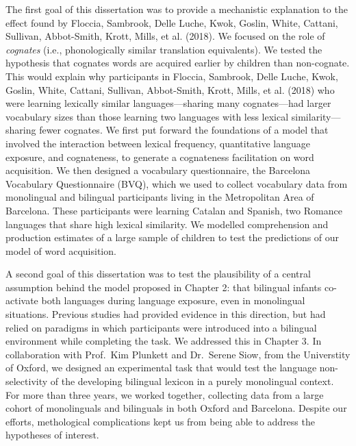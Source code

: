 \documentclass[
  12pt,
  b5paperpaper,
  twoside]{scrreprt}
\begin{document}
\begin{spacing}{1.5}
{The first goal of this dissertation was to provide a mechanistic
explanation to the effect found by Floccia, Sambrook, Delle Luche, Kwok,
Goslin, White, Cattani, Sullivan, Abbot-Smith, Krott, Mills, et al.
(2018). We focused on the role of \emph{cognates} (i.e., phonologically
similar translation equivalents). We tested the hypothesis that cognates
words are acquired earlier by children than non-cognate. This would
explain why participants in Floccia, Sambrook, Delle Luche, Kwok,
Goslin, White, Cattani, Sullivan, Abbot-Smith, Krott, Mills, et al.
(2018) who were learning lexically similar languages---sharing many
cognates---had larger vocabulary sizes than those learning two languages
with less lexical similarity---sharing fewer cognates. We first put
forward the foundations of a model that involved the interaction between
lexical frequency, quantitative language exposure, and cognateness, to
generate a cognateness facilitation on word acquisition. We then
designed a vocabulary questionnaire, the Barcelona Vocabulary
Questionnaire (BVQ), which we used to collect vocabulary data from
monolingual and bilingual participants living in the Metropolitan Area
of Barcelona. These participants were learning Catalan and Spanish, two
Romance languages that share high lexical similarity. We modelled
comprehension and production estimates of a large sample of children to
test the predictions of our model of word acquisition.

A second goal of this dissertation was to test the plausibility of a
central assumption behind the model proposed in Chapter 2: that
bilingual infants co-activate both languages during language exposure,
even in monolingual situations. Previous studies had provided evidence
in this direction, but had relied on paradigms in which participants
were introduced into a bilingual environment while completing the task.
We addressed this in Chapter 3. In collaboration with Prof.~Kim Plunkett
and Dr.~Serene Siow, from the Universtity of Oxford, we designed an
experimental task that would test the language non-selectivity of the
developing bilingual lexicon in a purely monolingual context. For more
than three years, we worked together, collecting data from a large
cohort of monolinguals and bilinguals in both Oxford and Barcelona.
Despite our efforts, methological complications kept us from being able
to address the hypotheses of interest.

}
\end{spacing}
\end{document}
